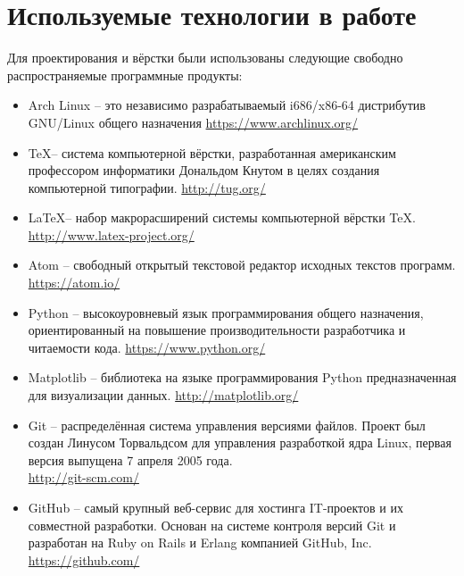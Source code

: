 \documentclass[a4paper, 14pt]{extreport}
\begin{document}
    \chapter{Используемые технологии в работе}
    Для проектирования и вёрстки были использованы следующие свободно распространяемые программные 
    продукты:
    \begin{itemize}
        \item Arch Linux -- это независимо разрабатываемый i686/x86-64 дистрибутив GNU/Linux общего 
            назначения \url{https://www.archlinux.org/}
        \item \TeX -- система компьютерной вёрстки, разработанная американским профессором информатики 
            Дональдом Кнутом в целях создания компьютерной типографии. \url{http://tug.org/}
        \item \LaTeX -- набор макрорасширений системы компьютерной вёрстки TeX.\\
            \url{http://www.latex-project.org/}
        \item Atom -- свободный открытый текстовой редактор исходных текстов программ.
            \url{https://atom.io/}
        \item Python -- высокоуровневый язык программирования общего назначения, ориентированный на повышение 
            производительности разработчика и читаемости кода. \url{https://www.python.org/}
        \item Matplotlib -- библиотека на языке программирования Python предназначенная для визуализации данных.
            \url{http://matplotlib.org/}
        \item Git -- распределённая система управления версиями файлов. Проект был создан Линусом 
            Торвальдсом для управления разработкой ядра Linux, первая версия выпущена 7 апреля 2005 года.\\
            \url{http://git-scm.com/}
        \item GitHub -- самый крупный веб-сервис для хостинга IT-проектов и их совместной разработки. 
            Основан на системе контроля версий Git и разработан на Ruby on Rails и Erlang компанией 
            GitHub, Inc.\\ \url{https://github.com/}
    \end{itemize}
\end{document}
